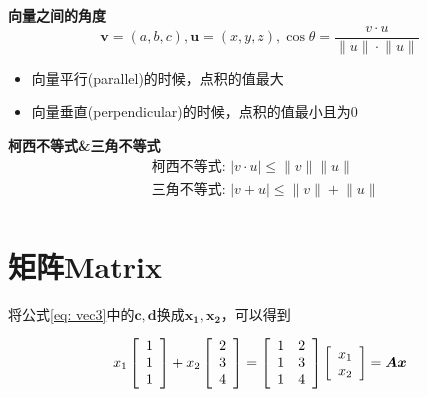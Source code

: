 \documentclass{book}
\begin{document}
\textbf{向量之间的角度}
\begin{equation}
  \boldsymbol{v}=(a, b, c), \boldsymbol{u}=(x, y, z), \cos{\theta}=\frac{v\cdot u}{\lVert u \rVert \cdot \lVert u \rVert }
  \label{eq: dotProduct2}
\end{equation}
\begin{itemize}
  \item 向量平行(parallel)的时候，点积的值最大
  \item 向量垂直(perpendicular)的时候，点积的值最小且为0
\end{itemize}

\textbf{柯西不等式\&三角不等式}
\begin{equation}
  \begin{aligned}
    &\text{柯西不等式: }\vert v \cdot u \vert \leq  \lVert v \rVert \lVert u \rVert \\
    &\text{三角不等式: } \vert v+u \vert \leq \lVert v \rVert + \lVert u \rVert \\
  \end{aligned}
  \label{eq: unequal}
\end{equation}

\section{矩阵Matrix}
将公式\ref{eq: vec3}中的$\boldsymbol{c, d}$换成$\boldsymbol{x_1, x_2}$，可以得到

\begin{equation}
   x_1\left[
     \begin{array}{c}
      1\\1\\1
     \end{array}\right] 
   +x_2\left[
     \begin{array}{c}
      2\\3\\4
     \end{array}\right]=
   \left[\begin{array}{c c}
     1 & 2\\
     1 & 3\\
     1 & 4\\
   \end{array}\right]
   \left[ 
   \begin{array}{c}
     x_1\\
     x_2
   \end{array}\right]=\boldsymbol{Ax}
  \label{eq: matrix1}
\end{equation}
\end{document}
